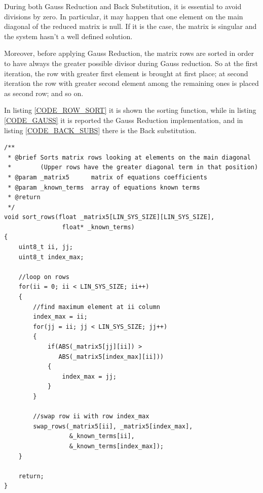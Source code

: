 \documentclass[main]{subfiles}
\begin{document}
During both Gauss Reduction and Back Substitution, it is essential to avoid 
divisions by zero.
In particular, it may happen that one element on the main diagonal of the reduced
matrix is null. If it is the case, the matrix is singular and the system hasn't a 
well defined solution.

Moreover, before applying Gauss Reduction, the matrix rows are sorted in order to 
have always the greater possible divisor during Gauss reduction.
So at the first iteration, the row with greater first element is brought at first 
place; at second iteration the row with greater second element among the remaining 
ones is placed as second row; and so on.

In listing \ref{CODE_ROW_SORT} it is shown the sorting function, while in listing 
\ref{CODE_GAUSS} it is reported the Gauss Reduction implementation, and in 
listing \ref{CODE_BACK_SUBS} there is the Back substitution.

\begin{minipage}[h]{\linewidth}
\begin{lstlisting}[caption=Row sorting, label=CODE_ROW_SORT]
/**
 * @brief Sorts matrix rows looking at elements on the main diagonal
 *        (Upper rows have the greater diagonal term in that position)
 * @param _matrix5      matrix of equations coefficients
 * @param _known_terms  array of equations known terms
 * @return
 */
void sort_rows(float _matrix5[LIN_SYS_SIZE][LIN_SYS_SIZE], 
                float* _known_terms)
{
    uint8_t ii, jj;
    uint8_t index_max;
    
    //loop on rows
    for(ii = 0; ii < LIN_SYS_SIZE; ii++)
    {
        //find maximum element at ii column
        index_max = ii;
        for(jj = ii; jj < LIN_SYS_SIZE; jj++)
        {
            if(ABS(_matrix5[jj][ii]) > 
               ABS(_matrix5[index_max][ii]))
            {
                index_max = jj;
            }
        }

        //swap row ii with row index_max
        swap_rows(_matrix5[ii], _matrix5[index_max], 
                  &_known_terms[ii], 
                  &_known_terms[index_max]);
    }

    return;
}
\end{lstlisting}
\end{minipage}
\end{document}
